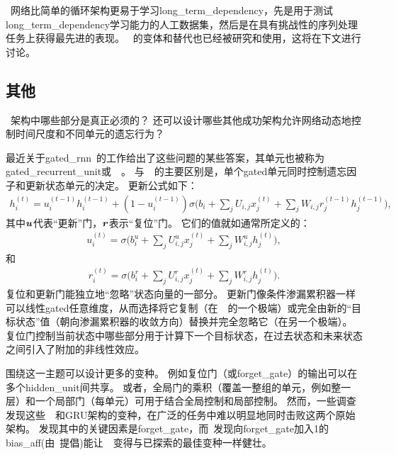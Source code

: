 
~网络比简单的循环架构更易于学习\gls{long_term_dependency}，先是用于测试\gls{long_term_dependency}学习能力的人工数据集\citep{Bengio-trnn94,Hochreiter+Schmidhuber-1997,chapter-gradient-flow-2001}，然后是在具有挑战性的序列处理任务上获得最先进的表现\citep{Graves-book2012,Graves-arxiv2013,Sutskever-et-al-NIPS2014}。
~的变体和替代也已经被研究和使用，这将在下文进行讨论。

\subsection{其他}
\label{sec:other_gated_rnns}
~架构中哪些部分是真正必须的？
还可以设计哪些其他成功架构允许网络动态地控制时间尺度和不同单元的遗忘行为？

最近关于\gls{gated_rnn}~的工作给出了这些问题的某些答案，其单元也被称为\gls{gated_recurrent_unit}或~~\citep{cho-al-arxiv14-ssst8,Chung-et-al-NIPSDL2014-small,chung-icml15-gated,Jozefowicz-et-al-ICML2015,Chrupala-et-al-arxiv2015}。
与~~的主要区别是，单个\gls{gated}单元同时控制遗忘因子和更新状态单元的决定。
更新公式如下：
\begin{align}
 h_i^{(t)} = u_i^{(t-1)} h_i^{(t-1)} + (1 - u_i^{(t-1)}) \sigma 
 \Big( b_i + \sum_j U_{i,j} x_j^{(t)} + \sum_j W_{i,j} r_j^{(t-1)} h_j^{(t-1)} \Big),
\end{align}
其中$\boldsymbol{\mathit{u}}$代表``更新''门，$\boldsymbol{\mathit{r}}$表示``复位''门。
它们的值就如通常所定义的：
\begin{align}
 u_i^{(t)} = \sigma \Big( b_i^u + \sum_j U_{i,j}^u x_j^{(t)} + \sum_j W_{i,j}^u h_j^{(t)} \Big),
\end{align}
和
\begin{align}
 r_i^{(t)} = \sigma \Big( b_i^r + \sum_j U_{i,j}^r x_j^{(t)} + \sum_j W_{i,j}^r h_j^{(t)} \Big).
\end{align}
复位和更新门能独立地``忽略''状态向量的一部分。
更新门像条件渗漏累积器一样可以线性\gls{gated}任意维度，从而选择将它复制（在~~的一个极端）或完全由新的``目标状态''值（朝向渗漏累积器的收敛方向）替换并完全忽略它（在另一个极端）。
复位门控制当前状态中哪些部分用于计算下一个目标状态，在过去状态和未来状态之间引入了附加的非线性效应。


围绕这一主题可以设计更多的变种。
例如复位门（或\gls{forget_gate}）的输出可以在多个\gls{hidden_unit}间共享。
或者，全局门的乘积（覆盖一整组的单元，例如整一层）和一个局部门（每单元）可用于结合全局控制和局部控制。
然而，一些调查发现这些~~和GRU架构的变种，在广泛的任务中难以明显地同时击败这两个原始架构\citep{Greff-et-al-arxiv2015,Jozefowicz-et-al-ICML2015}。
\cite{Greff-et-al-arxiv2015}发现其中的关键因素是\gls{forget_gate}，而~\cite{Jozefowicz-et-al-ICML2015}发现向\gls{forget_gate}加入1的\gls{bias_aff}(由~\cite{Gers-et-al-2000}提倡)能让~~变得与已探索的最佳变种一样健壮。

